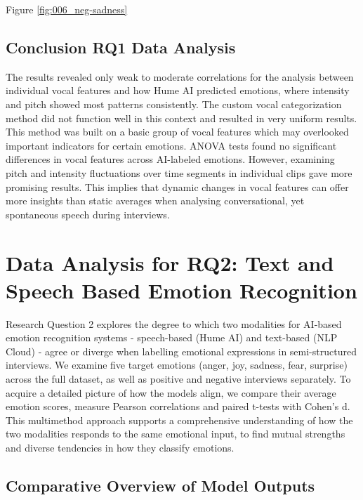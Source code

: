 Figure \ref{fig:006_neg-sadness} 


\subsection{Conclusion RQ1 Data Analysis}
The results revealed only weak to moderate correlations for the analysis between individual vocal features and how Hume AI predicted emotions, where intensity and pitch showed most patterns consistently. 
The custom vocal categorization method did not function well in this context and resulted in very uniform results. This method was built on a basic group of vocal features which may overlooked important indicators for certain emotions. 
ANOVA tests found no significant differences in vocal features across AI-labeled emotions. However, examining pitch and intensity fluctuations over time segments in individual clips gave more promising results. This implies that dynamic changes in vocal features 
can offer more insights than static averages when analysing conversational, yet spontaneous speech during interviews. 

\section{Data Analysis for RQ2: Text and Speech Based Emotion Recognition}
Research Question 2 explores the degree to which two modalities for AI-based emotion recognition systems - speech-based (Hume AI) and text-based (NLP Cloud) - agree or diverge when labelling emotional expressions in semi-structured interviews. 
We examine five target emotions (anger, joy, sadness, fear, surprise) across the full dataset, as well as positive and negative interviews separately. To acquire a detailed picture of how the models align, we compare their average emotion scores, 
measure Pearson correlations and paired t-tests with Cohen’s d. This multimethod approach supports a comprehensive understanding of how the two modalities responds to the same emotional input, to find mutual strengths and diverse tendencies in how they classify emotions. 
\subsection{Comparative Overview of Model Outputs}

